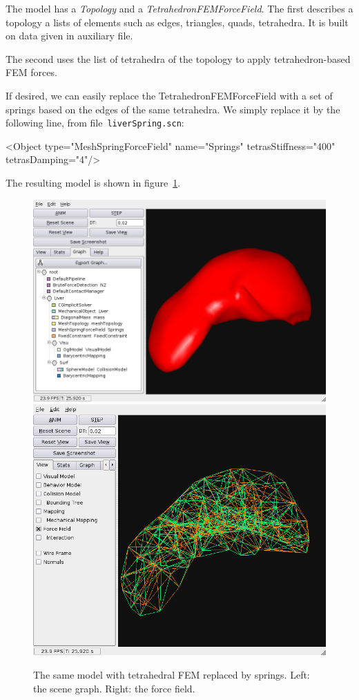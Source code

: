 \documentclass[a4paper,11pt]{article}
\newcommand{\file}[1]{\texttt{#1}}
\begin{document}
The model has a \emph{Topology} and a \emph{TetrahedronFEMForceField}.
The first describes a topology a lists of elements such as edges, triangles, quads, tetrahedra. 
It is built on data given in auxiliary file.

The second uses the list of tetrahedra of the topology to apply tetrahedron-based FEM forces.

If desired, we can easily replace the TetrahedronFEMForceField with a set of springs based on the edges of the same tetrahedra.
We simply replace it by the following line, from file~\file{liverSpring.scn}:
\begin{code_xml}
<Object type="MeshSpringForceField" name="Springs" tetrasStiffness="400" tetrasDamping="4"/>
\end{code_xml}
The resulting model is shown in figure~\ref{fig:liverSpring}.
\begin{figure}[ht]
	\centering
	\includegraphics[height=0.3\linewidth]{liverSpring-graph.png}
	\includegraphics[height=0.3\linewidth]{liverSpring-force.png}
	\caption{The same model with tetrahedral FEM replaced by springs. Left: the scene graph. Right: the force field. }
	\label{fig:liverSpring}
\end{figure}
\end{document}
